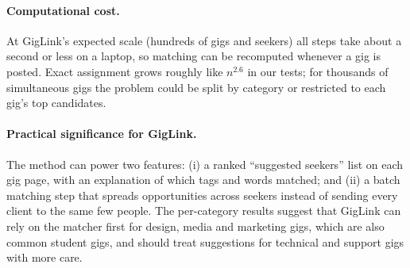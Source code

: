 \documentclass[12pt,a4paper]{article}
\numberwithin{equation}{section}
\theoremstyle{definition}
\theoremstyle{plain}
\begin{document}
\paragraph{Computational cost.} At GigLink's expected scale (hundreds of gigs and seekers) all steps take about a second or less on a laptop, so matching can be recomputed whenever a gig is posted. Exact assignment grows roughly like $n^{2.6}$ in our tests; for thousands of simultaneous gigs the problem could be split by category or restricted to each gig's top candidates.

\paragraph{Practical significance for GigLink.} The method can power two features: (i) a ranked \enquote{suggested seekers} list on each gig page, with an explanation of which tags and words matched; and (ii) a batch matching step that spreads opportunities across seekers instead of sending every client to the same few people. The per-category results suggest that GigLink can rely on the matcher first for design, media and marketing gigs, which are also common student gigs, and should treat suggestions for technical and support gigs with more care.
\end{document}
